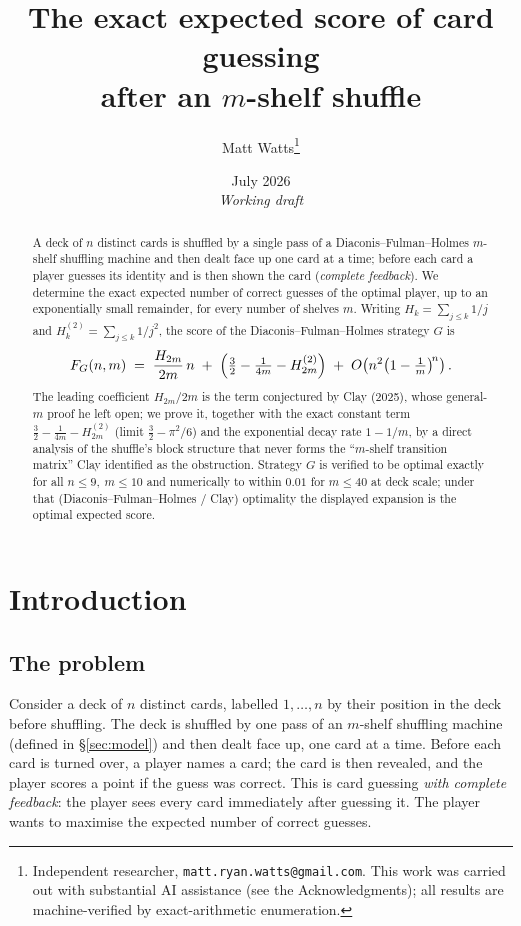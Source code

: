 \documentclass[11pt]{article}
\title{The exact expected score of card guessing\\ after an $m$-shelf shuffle}
\author{Matt Watts\thanks{Independent researcher, \texttt{matt.ryan.watts@gmail.com}.
This work was carried out with substantial AI assistance (see the Acknowledgments);
all results are machine-verified by exact-arithmetic enumeration.}}
\date{July 2026\\[2pt]\emph{Working draft}}
\theoremstyle{definition}
\newcommand{\Fg}{F_G}
\newcommand{\bigoh}{O}
\begin{document}
\maketitle

\begin{abstract}
A deck of $n$ distinct cards is shuffled by a single pass of a Diaconis--Fulman--Holmes
$m$-shelf shuffling machine and then dealt face up one card at a time; before each card a
player guesses its identity and is then shown the card (\emph{complete feedback}). We
determine the exact expected number of correct guesses of the optimal player, up to an
exponentially small remainder, for every number of shelves $m$. Writing $H_k=\sum_{j\le
k}1/j$ and $H_k^{(2)}=\sum_{j\le k}1/j^{2}$, the score of the Diaconis--Fulman--Holmes
strategy $G$ is
\[
  \Fg(n,m)\;=\;\frac{H_{2m}}{2m}\,n\;+\;\Bigl(\tfrac32-\tfrac{1}{4m}-H_{2m}^{(2)}\Bigr)
  \;+\;\bigoh\!\left(n^2\bigl(1-\tfrac1m\bigr)^{\!n}\right).
\]
The leading coefficient $H_{2m}/2m$ is the term conjectured by Clay (2025), whose general-$m$
proof he left open; we prove it, together with the exact constant term $\tfrac32-\tfrac1{4m}
-H_{2m}^{(2)}$ (limit $\tfrac32-\pi^2/6$) and the exponential decay rate $1-1/m$, by a direct
analysis of the shuffle's block structure that never forms the ``$m$-shelf transition
matrix'' Clay identified as the obstruction. Strategy $G$ is verified to be optimal exactly
for all $n\le 9,\ m\le 10$ and numerically to within $0.01$ for $m\le 40$ at deck scale; under
that (Diaconis--Fulman--Holmes / Clay) optimality the displayed expansion is the optimal
expected score.
\end{abstract}

\section{Introduction}

\subsection*{The problem}
Consider a deck of $n$ distinct cards, labelled $1,\dots,n$ by their position in the deck
before shuffling. The deck is shuffled by one pass of an $m$-shelf shuffling machine (defined
in \S\ref{sec:model}) and then dealt face up, one card at a time. Before each card is turned
over, a player names a card; the card is then revealed, and the player scores a point if the
guess was correct. This is card guessing \emph{with complete feedback}: the player sees every
card immediately after guessing it. The player wants to maximise the expected number of
correct guesses.
\end{document}
